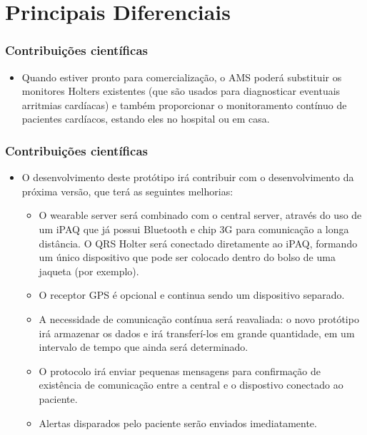 \documentclass{beamer}
\begin{document}
\section{Principais Diferenciais}

\begin{frame}
\frametitle{Contribuições científicas}

	\begin{itemize}
		\item Quando estiver pronto para comercialização, o AMS poderá substituir os monitores Holters existentes (que são usados para diagnosticar eventuais arritmias cardíacas) e também proporcionar o monitoramento contínuo de pacientes cardíacos, estando eles no hospital ou em casa.
	\end{itemize}
\end{frame}


\begin{frame}
\frametitle{Contribuições científicas}

	\begin{itemize}
		\item O desenvolvimento deste protótipo irá contribuir com o desenvolvimento da próxima versão, que terá as seguintes melhorias:
		\begin{itemize}
			\item O wearable server será combinado com o central server, através do uso de um iPAQ que já possui Bluetooth e chip 3G para comunicação a longa distância. O QRS Holter será conectado diretamente ao iPAQ, formando um único dispositivo que pode ser colocado dentro do bolso de uma jaqueta (por exemplo).
			\item O receptor GPS é opcional e continua sendo um dispositivo separado.
			\item A necessidade de comunicação contínua será reavaliada: o novo protótipo irá armazenar os dados e irá transferí-los em grande quantidade, em um intervalo de tempo que ainda será determinado.
			\item O protocolo irá enviar pequenas mensagens para confirmação de existência de comunicação entre a central e o dispostivo conectado ao paciente. 
			\item Alertas disparados pelo paciente serão enviados imediatamente.
		\end{itemize}
	\end{itemize}
\end{frame}
\end{document}
